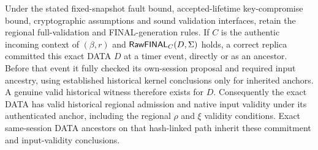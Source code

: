 \begin{proposition}
\label{prop:final-kernel-soundness}
Under the stated fixed-snapshot fault bound, accepted-lifetime
key-compromise bound, cryptographic assumptions and sound validation
interfaces, retain the regional full-validation and FINAL-generation
rules. If $C$ is the authentic incoming context of $(\beta,r)$ and
$\mathsf{RawFINAL}_C(D,\Sigma)$ holds, a correct replica committed this
exact DATA $D$ at a timer event, directly or as an ancestor. Before that
event it fully checked its own-session proposal and required input
ancestry, using established historical kernel conclusions only for
inherited anchors. A genuine valid historical witness therefore exists
for $D$. Consequently the exact DATA has
valid historical regional admission and native input validity under
its authenticated anchor, including the regional $\rho$ and $\xi$
validity conditions. Exact same-session
DATA ancestors on that hash-linked path inherit these commitment and
input-validity conclusions.
\end{proposition}
